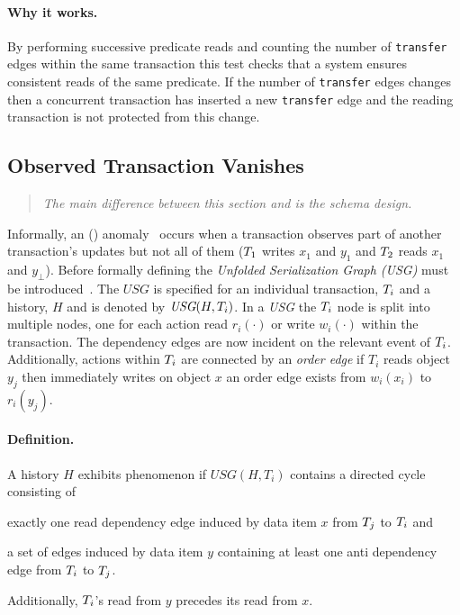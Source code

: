 \paragraph{Why it works.}
By performing successive predicate reads and counting the number of 
\texttt{transfer} edges within the same transaction this test checks that a 
system ensures consistent reads of the same predicate. If the number of 
\texttt{transfer} edges changes then a concurrent transaction has inserted a new
\texttt{transfer} edge and the reading transaction is not protected from this 
change.

\subsection{Observed Transaction Vanishes}
\label{sec:observ-trans-vanish}

\begin{quote}
  \textit{The main difference between this section and \ldbcsnb\xspace
          is the schema design.
  }
\end{quote}

Informally, an  () 
anomaly~\cite{DBLP:journals/pvldb/BailisDFGHS13} occurs when a transaction 
observes part of another transaction's updates but not all of them 
(\eg $T_1$ writes $x_1$ and $y_1$ and $T_2$ reads $x_1$ and $y_\bot$).
Before formally defining  the \emph{Unfolded Serialization Graph (USG)} 
must be introduced~\cite{adya1999weak}. The $\textit{USG}$ is specified for an 
individual transaction, $T_i$ and a history, $H$ and is denoted by 
$\textit{USG}(H,T_i)$. In a \emph{USG} the $T_i$ node is split into 
multiple nodes, one for each action read $r_i(\cdot)$ or  write $w_i(\cdot)$  
within the transaction. The dependency edges are now incident on the relevant 
event of $T_i$. Additionally, actions within $T_i$ are connected by 
an \emph{order edge} \eg if $T_i$ reads object $y_j$ then immediately writes on 
object $x$ an order edge exists from $w_i(x_i)$ to $r_i(y_j)$.

\paragraph{Definition.}
A history $H$ exhibits phenomenon  if $\textit{USG}(H,T_i)$ 
contains a directed cycle consisting of 
\begin{enumerate*}[label={(\roman*)}]
  \item exactly one read dependency edge induced by data item $x$ from 
        $T_j$ to $T_i$ and
  \item a set of edges induced by data item $y$ containing at least one anti 
        dependency edge from $T_i$ to $T_j$.
\end{enumerate*}
Additionally, $T_i$'s read from $y$ precedes its read from $x$.

